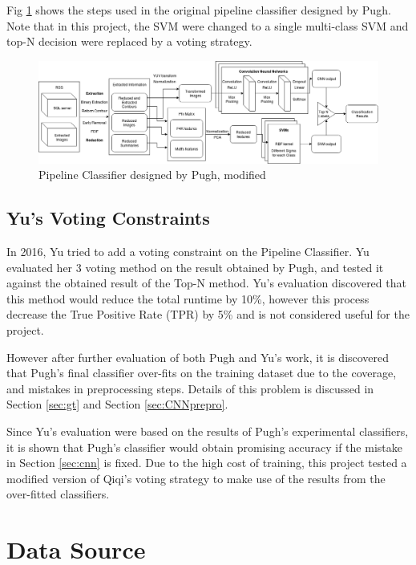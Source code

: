 \documentclass[bsc,logo,twoside,fullspacing,parskip]{infthesis}
\begin{document}
Fig \ref{fig:pipeline} shows the steps used in the original pipeline classifier designed by Pugh.
Note that in this project, the SVM were changed to a single multi-class SVM and top-N decision were replaced by a voting strategy.

\begin{figure}[!h]
    \centering
    \includegraphics[scale=0.3]{graph/Pipeline_Classifier.png}
    \caption{Pipeline Classifier designed by Pugh, modified}
    \label{fig:pipeline}
\end{figure}

\section{Yu's Voting Constraints}

In 2016, Yu\cite{Yu} tried to add a voting constraint on the Pipeline Classifier. 
Yu evaluated her 3 voting method on the result obtained by Pugh, and tested it against the obtained result of the Top-N method. 
Yu's evaluation discovered that this method would reduce the total runtime by 10\%, however this process decrease the True Positive Rate (TPR) by 5\% and is not considered useful for the project. 

However after further evaluation of both Pugh and Yu's work, it is discovered that Pugh's final classifier over-fits on the training dataset due to the coverage, and mistakes in preprocessing steps. Details of this problem is discussed in Section \ref{sec:gt} and Section \ref{sec:CNNprepro}. 

Since Yu's evaluation were based on the results of Pugh's experimental classifiers, it is shown that Pugh's classifier would obtain promising accuracy if the mistake in Section \ref{sec:cnn} is fixed. Due to the high cost of training, this project tested a modified version of Qiqi's voting strategy to make use of the results from the over-fitted classifiers. 

\chapter{Data Source}
\label{chap:datasource}
\end{document}
